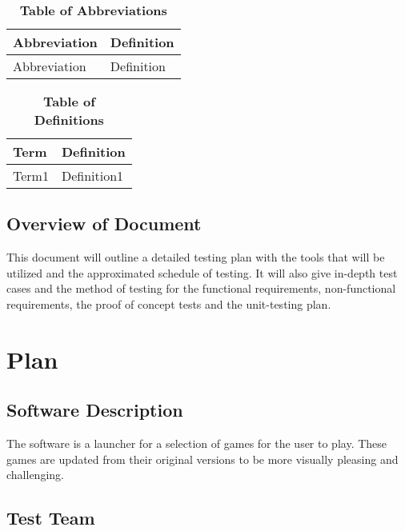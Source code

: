 \documentclass[12pt, titlepage]{article}
\begin{document}
\begin{table}[hbp]
\caption{\textbf{Table of Abbreviations}} \label{Abbrev}

\begin{tabularx}{\textwidth}{p{3cm}X}
\toprule
\textbf{Abbreviation} & \textbf{Definition} \\
\midrule
Abbreviation & Definition\\
\bottomrule
\end{tabularx}

\end{table}

\begin{table}[!htbp]
\caption{\textbf{Table of Definitions}} \label{Defs}

\begin{tabularx}{\textwidth}{p{3cm}X}
\toprule
\textbf{Term} & \textbf{Definition}\\
\midrule
Term1 & Definition1\\
\bottomrule
\end{tabularx}

\end{table}	

\subsection{Overview of Document}

This document will outline a detailed testing plan with the tools that will be utilized and the approximated schedule of testing. It will also give in-depth test cases and the method of testing for the functional requirements, non-functional requirements, the proof of concept tests and the unit-testing plan.

\section{Plan}
	
\subsection{Software Description}

The software is a launcher for a selection of games for the user to play. These games are updated from their original versions to be more visually pleasing and challenging.

\subsection{Test Team}
\end{document}
